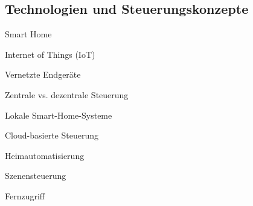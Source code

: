 \subsection{Technologien und Steuerungskonzepte} 
Smart Home

Internet of Things (IoT)

Vernetzte Endgeräte

Zentrale vs. dezentrale Steuerung

Lokale Smart-Home-Systeme

Cloud-basierte Steuerung

Heimautomatisierung

Szenensteuerung

Fernzugriff